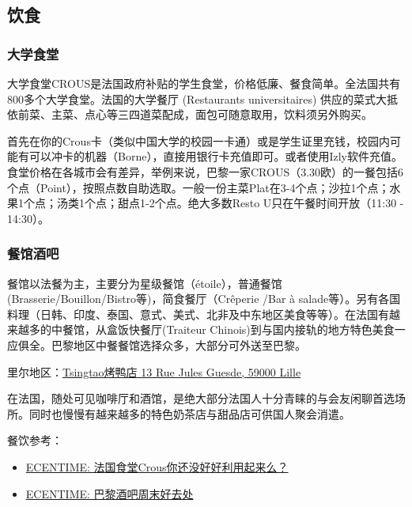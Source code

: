\subsection{饮食}

\subsubsection{大学食堂}
大学食堂CROUS是法国政府补贴的学生食堂，价格低廉、餐食简单。全法国共有800多个大学食堂。法国的大学餐厅 (Restaurants universitaires) 供应的菜式大抵依前菜、主菜、点心等三四道菜配成，面包可随意取用，饮料须另外购买。

首先在你的Crous卡（类似中国大学的校园一卡通）或是学生证里充钱，校园内可能有可以冲卡的机器（Borne），直接用银行卡充值即可。或者使用Izly软件充值。食堂价格在各城市会有差异，举例来说，巴黎一家CROUS（3.30欧）的一餐包括6个点（Point），按照点数自助选取。一般一份主菜Plat在3-4个点；沙拉1个点；水果1个点；汤类1个点；甜点1-2个点。绝大多数Resto U只在午餐时间开放（11:30 - 14:30）。

\subsubsection{餐馆酒吧}
餐馆以法餐为主，主要分为星级餐馆（étoile），普通餐馆(Brasserie/Bouillon/Bistro等)，简食餐厅（Crêperie /Bar à salade等）。另有各国料理（日韩、印度、泰国、意式、美式、北非及中东地区美食等等）。在法国有越来越多的中餐馆，从盒饭快餐厅(Traiteur Chinois)到与国内接轨的地方特色美食一应俱全。巴黎地区中餐餐馆选择众多，大部分可外送至巴黎。

里尔地区：\href{https://maps.app.goo.gl/ScHQq7jbV4Bug9JJ7}{Tsingtao烤鸭店 13 Rue Jules Guesde, 59000 Lille}

在法国，随处可见咖啡厅和酒馆，是绝大部分法国人十分青睐的与会友闲聊首选场所。同时也慢慢有越来越多的特色奶茶店与甜品店可供国人聚会消遣。

餐饮参考：
\begin{itemize}
    \item \href{https://www.ecentime.com/article/comment-profider-le-crous-en-france}{ECENTIME: 法国食堂Crous你还没好好利用起来么？}
    \item \href{https://www.ecentime.com/article/ecentime-bar-paris}{ECENTIME: 巴黎酒吧周末好去处}
\end{itemize}
